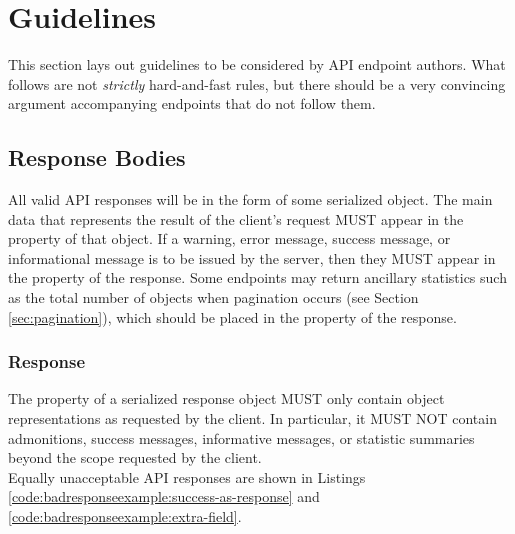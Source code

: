 %
%

\section{Guidelines}
This section lays out guidelines to be considered by API endpoint authors. What follows are not \emph{strictly} hard-and-fast rules, but
there should be a very convincing argument accompanying endpoints that do not follow them.

\subsection{Response Bodies}
All valid API responses will be in the form of some serialized object. The main
data that represents the result of the client's request MUST appear in the
 property of that object. If a warning, error message, success
message, or informational message is to be issued by the server, then they MUST
appear in the  property of the response. Some endpoints may return
ancillary statistics such as the total number of objects when pagination occurs
(see Section \ref{sec:pagination}), which should be placed in the 
property of the response.\\

\subsubsection{Response}
The  property of a serialized response object MUST only contain
object representations as requested by the client. In particular, it MUST NOT
contain admonitions, success messages, informative messages, or statistic
summaries beyond the scope requested by the client.\\
Equally unacceptable API responses are shown in Listings
\ref{code:badresponseexample:success-as-response} and
\ref{code:badresponseexample:extra-field}.

